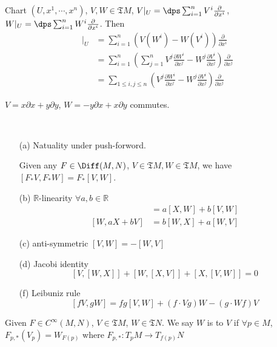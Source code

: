 \begin{proposition}
    Chart  $ (U,x^1,\cdots,x^n) $,  $ V,W\in \mathfrak{T}M $,  $ V|_U=\dps\sum_{i=1}^n V^i\frac{\partial }{\partial  x^i} $,  $ W|_U=\dps\sum_{i=1}^nW^i\frac{\partial}{\partial x^i} $. Then 
    \begin{align*}
        [V,W]|_U&=\sum_{i=1}^n(V(W^i)-W(V^i))\frac{\partial}{\partial x^i}\\
        &=\sum_{i=1}^n(\sum_{j=1}^nV^j\frac{\partial W^i}{\partial x^j}-W^j\frac{\partial V^i}{\partial x^j})\frac{\partial }{\partial x^j}\\
        &=\sum_{1 \leq i,j \leq n}(V^j\frac{\partial W^i}{\partial x^j}-W^j\frac{\partial V^i}{\partial x^j})\frac{\partial}{\partial x^j}
    \end{align*}
\end{proposition}
\begin{example}
     $ V=x\partial x+y\partial y $,  $ W=-y\partial x+x\partial y $ commutes.  
\end{example}
\begin{proposition}\label{properties of Lie bracket}
    \,
    \begin{enumerate}
        \item[(a)] Natuality under push-forword.
        
        Given any  $ F\in \Diff(M,N) $,  $ V\in \mathfrak{T}M, W\in \mathfrak{T}M  $, we have  $ [F_*V,F_*W]=F_*[V,W] $.
        \item[(b)]  $ \mathbb{R} $-linearity  $ \forall a,b\in \mathbb{R} $
        \begin{align*}
            [aX+bV,W]&=a[X,W]+b[V,W]\\
            [W,aX+bV]&=b[W,X]+a[W,V]
        \end{align*}  
        
        \item[(c)] anti-symmetric  $ [V,W]=-[W,V] $
        \item[(d)] Jacobi identity 
        \[[V,[W,X]]+[W,[X,V]]+[X,[V,W]]=0\]     
        \item[(f)] Leibuniz rule 
        \[[fV,gW]=fg[V,W]+(f\cdot Vg)W-(g\cdot Wf)V\]
    \end{enumerate}
\end{proposition}
\begin{definition}
    Given  $ F\in C^\infty(M,N) $,  $ V\in \mathfrak{T}M $,  $ W\in \mathfrak{T}N $. We say  $ W $ is   to  $ V $ if  $ \forall p\in M $,  $ F_{p,*}(V_p)=W_{F(p)} $ where $  F_{p,*}:T_pM\rightarrow T_{f(p)}N $      
\end{definition}
